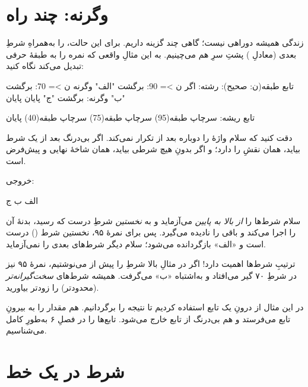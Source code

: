 \section{وگرنه: چند راه}

زندگی همیشه دوراهی نیست؛ گاهی چند گزینه داریم. برای این حالت، 
را به‌همراهِ شرطِ بعدی (معادلِ ) پشتِ سرِ هم می‌چینیم. به این
مثالِ واقعی که نمره را به طبقهٔ حرفی تبدیل می‌کند نگاه کنید:

\begin{salamfa}
تابع طبقه(ن: صحیح): رشته:
    اگر ن >= 90:
        برگشت "الف"
    وگرنه ن >= 70:
        برگشت "ب"
    وگرنه:
        برگشت "ج"
    پایان
پایان

تابع ریشه:
    سرچاپ طبقه(95)
    سرچاپ طبقه(75)
    سرچاپ طبقه(40)
پایان
\end{salamfa}

\begin{tip}
دقت کنید که سلام واژهٔ  را دوباره بعد از  تکرار
نمی‌کند. اگر بی‌درنگ بعد از  یک شرط بیاید، همان نقشِ
 را دارد؛ و اگر  بدونِ هیچ شرطی بیاید، همان
شاخهٔ نهایی و پیش‌فرض است.
\end{tip}

خروجی:

\begin{salamen}[language={}]
الف
ب
ج
\end{salamen}

سلام شرط‌ها را \emph{از بالا به پایین} می‌آزماید و به \emph{نخستین} شرطِ درست
که رسید، بدنهٔ آن را اجرا می‌کند و باقی را نادیده می‌گیرد. پس برای نمرهٔ ۹۵،
نخستین شرط () درست است و «الف» بازگردانده می‌شود؛ سلام دیگر شرط‌های
بعدی را نمی‌آزماید.

\begin{warn}
ترتیبِ شرط‌ها اهمیت دارد! اگر در مثالِ بالا شرطِ  را پیش از
 می‌نوشتیم، نمرهٔ ۹۵ نیز در شرطِ ۷۰ گیر می‌افتاد و به‌اشتباه «ب»
می‌گرفت. همیشه شرط‌های \emph{سخت‌گیرانه‌تر} (محدودتر) را زودتر بیاورید.
\end{warn}

\begin{note}
در این مثال از  درونِ یک تابع استفاده کردیم تا نتیجه را برگردانیم.
 هم مقدار را به بیرونِ تابع می‌فرستد و هم بی‌درنگ از تابع خارج
می‌شود. تابع‌ها را در فصلِ ۶ به‌طورِ کامل می‌شناسیم.
\end{note}

\section{شرط در یک خط}

